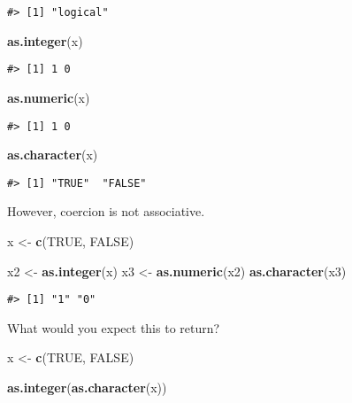 \documentclass[]{book}
\newenvironment{Shaded}{\begin{snugshade}}{\end{snugshade}}
\newcommand{\KeywordTok}[1]{\textcolor[rgb]{0.13,0.29,0.53}{\textbf{#1}}}
\newcommand{\StringTok}[1]{\textcolor[rgb]{0.31,0.60,0.02}{#1}}
\newcommand{\OtherTok}[1]{\textcolor[rgb]{0.56,0.35,0.01}{#1}}
\newcommand{\NormalTok}[1]{#1}
\theoremstyle{definition}
\theoremstyle{definition}
\theoremstyle{definition}
\theoremstyle{remark}
\begin{document}
\begin{verbatim}
#> [1] "logical"
\end{verbatim}

\begin{Shaded}
\begin{Highlighting}[]
\KeywordTok{as.integer}\NormalTok{(x)}
\end{Highlighting}
\end{Shaded}

\begin{verbatim}
#> [1] 1 0
\end{verbatim}

\begin{Shaded}
\begin{Highlighting}[]
\KeywordTok{as.numeric}\NormalTok{(x)}
\end{Highlighting}
\end{Shaded}

\begin{verbatim}
#> [1] 1 0
\end{verbatim}

\begin{Shaded}
\begin{Highlighting}[]
\KeywordTok{as.character}\NormalTok{(x)}
\end{Highlighting}
\end{Shaded}

\begin{verbatim}
#> [1] "TRUE"  "FALSE"
\end{verbatim}

However, coercion is not associative.

\begin{Shaded}
\begin{Highlighting}[]
\NormalTok{x <-}\StringTok{ }\KeywordTok{c}\NormalTok{(}\OtherTok{TRUE}\NormalTok{, }\OtherTok{FALSE}\NormalTok{)}

\NormalTok{x2 <-}\StringTok{ }\KeywordTok{as.integer}\NormalTok{(x)}
\NormalTok{x3 <-}\StringTok{ }\KeywordTok{as.numeric}\NormalTok{(x2)}
\KeywordTok{as.character}\NormalTok{(x3)}
\end{Highlighting}
\end{Shaded}

\begin{verbatim}
#> [1] "1" "0"
\end{verbatim}

What would you expect this to return?

\begin{Shaded}
\begin{Highlighting}[]
\NormalTok{x <-}\StringTok{ }\KeywordTok{c}\NormalTok{(}\OtherTok{TRUE}\NormalTok{, }\OtherTok{FALSE}\NormalTok{)}

\KeywordTok{as.integer}\NormalTok{(}\KeywordTok{as.character}\NormalTok{(x))}
\end{Highlighting}
\end{Shaded}
\end{document}
